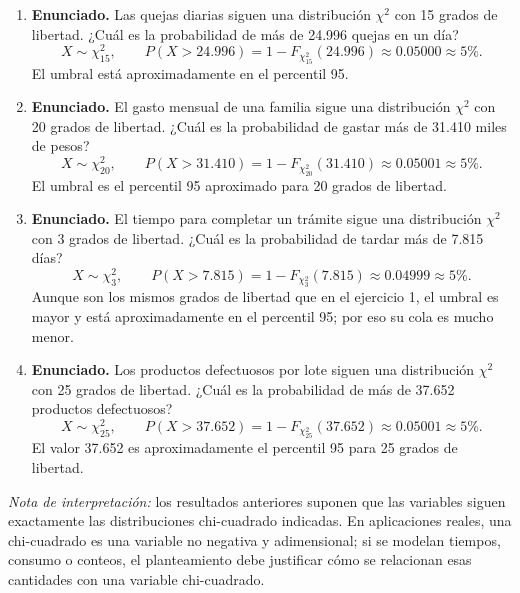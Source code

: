 \documentclass[11pt]{article}
\begin{document}
\begin{enumerate}
  \item \textbf{Enunciado.} Las quejas diarias siguen una distribución $\chi^2$ con 15 grados de libertad. ¿Cuál es la probabilidad de más de 24.996 quejas en un día?
  \[
  X\sim\chi^2_{15},\qquad P(X>24.996)=1-F_{\chi^2_{15}}(24.996)\approx0.05000\approx5\%.
  \]
  El umbral está aproximadamente en el percentil 95.

  \item \textbf{Enunciado.} El gasto mensual de una familia sigue una distribución $\chi^2$ con 20 grados de libertad. ¿Cuál es la probabilidad de gastar más de 31.410 miles de pesos?
  \[
  X\sim\chi^2_{20},\qquad P(X>31.410)=1-F_{\chi^2_{20}}(31.410)\approx0.05001\approx5\%.
  \]
  El umbral es el percentil 95 aproximado para 20 grados de libertad.

  \item \textbf{Enunciado.} El tiempo para completar un trámite sigue una distribución $\chi^2$ con 3 grados de libertad. ¿Cuál es la probabilidad de tardar más de 7.815 días?
  \[
  X\sim\chi^2_3,\qquad P(X>7.815)=1-F_{\chi^2_3}(7.815)\approx0.04999\approx5\%.
  \]
  Aunque son los mismos grados de libertad que en el ejercicio 1, el umbral es mayor y está aproximadamente en el percentil 95; por eso su cola es mucho menor.

  \item \textbf{Enunciado.} Los productos defectuosos por lote siguen una distribución $\chi^2$ con 25 grados de libertad. ¿Cuál es la probabilidad de más de 37.652 productos defectuosos?
  \[
  X\sim\chi^2_{25},\qquad P(X>37.652)=1-F_{\chi^2_{25}}(37.652)\approx0.05001\approx5\%.
  \]
  El valor 37.652 es aproximadamente el percentil 95 para 25 grados de libertad.
\end{enumerate}

\textit{Nota de interpretación:} los resultados anteriores suponen que las variables siguen exactamente las distribuciones chi-cuadrado indicadas. En aplicaciones reales, una chi-cuadrado es una variable no negativa y adimensional; si se modelan tiempos, consumo o conteos, el planteamiento debe justificar cómo se relacionan esas cantidades con una variable chi-cuadrado.
\end{document}
